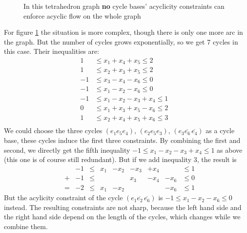 \begin{figure}[h!]
\centering
{}
\caption{In this tetrahedron graph \textbf{no} cycle bases' acyclicity constraints can enforce acyclic flow on the 
whole 
graph}
 \label{bild:reichtkreisbasis2}
\end{figure}
For figure \ref{bild:reichtkreisbasis2} the situation is more complex, though there is only one more arc in the graph. 
But the number of cycles grows exponentially, so we get 7 cycles in this case. Their inequalities are:
\begin{align*}
 1 &\le x_1+x_4+x_5\le 2&\\
 1&\le x_2+x_3+x_5\le 2& \\%
 -1&\le x_3-x_4-x_6\le 0\\
 -1&\le x_1-x_2-x_6\le 0\\ 
 -1 &\le x_1-x_2-x_3+x_4 \le 1&\\
 0 &\le x_1+x_3+x_5-x_6\le 2\\
 1&\le x_2+x_4+x_5+x_6\le 3\\
\end{align*}
We could choose the three cycles $(e_1 e_5 e_4)$, $(e_2 e_5 e_3)$, $(e_3 \overline{e_6}\, \overline{e_4})$ as a cycle 
base, these cycles induce the first three constraints. By combining the first and second, we directly get the fifth 
inequality $-1 \le x_1-x_2-x_3+x_4 \le 1$ as above (this one is of course still redundant). But if we add inequality 
$3$, the result is 
\begin{align*}
 &&-1 &\le &x_1&-x_2&-x_3&+x_4 &&\le 1\\
 &+&-1&\le &&&x_3&-x_4&-x_6&\le 0\\
 &=&-2&\le&x_1&-x_2&&&-x_6&\le 1
\end{align*}
But the acylicity constraint of the cycle $(e_1 \overline{e_2} \,\overline{e_6})$ is $-1\le x_1-x_2-x_6\le 0$ instead. 
The resulting constraints are not sharp, because the left hand side and the right hand side depend on the length of the 
cycles, which changes while we combine them.

